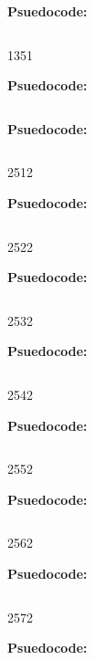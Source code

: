 \textbf{Psuedocode:}
\begin{verbatim}
\end{verbatim}


   {135}{1}

\textbf{Psuedocode:}
\begin{verbatim}
\end{verbatim}



\textbf{Psuedocode:}
\begin{verbatim}
\end{verbatim}


        {251}{2}

\textbf{Psuedocode:}
\begin{verbatim}
\end{verbatim}


        {252}{2}

\textbf{Psuedocode:}
\begin{verbatim}
\end{verbatim}


        {253}{2}

\textbf{Psuedocode:}
\begin{verbatim}
\end{verbatim}


      {254}{2}

\textbf{Psuedocode:}
\begin{verbatim}
\end{verbatim}


        {255}{2}

\textbf{Psuedocode:}
\begin{verbatim}
\end{verbatim}


       {256}{2}

\textbf{Psuedocode:}
\begin{verbatim}
\end{verbatim}


  {257}{2}

\textbf{Psuedocode:}
\begin{verbatim}
\end{verbatim}


